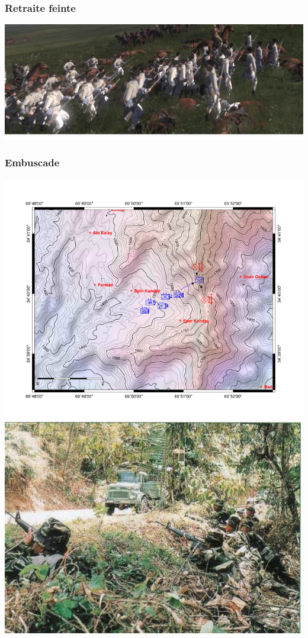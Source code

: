 \documentclass{article}
\begin{document}
\subsubsection{Retraite feinte}
\includegraphics[width=\linewidth]{../ressources/infantrysquare3}
\cite{mongol_army,feigned_retreat}


\subsubsection{Embuscade}
\includegraphics[width=\linewidth]{../ressources/Uzbin_valley_ambush-map}
\includegraphics[width=\linewidth]{../ressources/ambush}
\cite{ambush_wiki, uzbin_ambush, ambush_picture}
\end{document}
